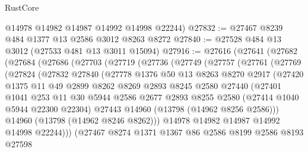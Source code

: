 \begin{lexlean}{RustCore}
\begin{coremodule}
      @14978
      @14982
      @14987
      @14992
      @14998
      @22244)
@27832 := @27467 @8239 @484 @1377 @13 @2586 @3012 @8263 @8272
@27840 := @27528 @484 @13 @3012 (@27533 @481 @13 @3011 @15094)
@27916 := @27616
    (@27641
      (@27682
        (@27684
          (@27686
            (@27703
              (@27719
                (@27736
                  (@27749
                    (@27757
                      (@27761
                        (@27769
                          (@27824
                            (@27832
                              @27840
                              (@27778
                                @1376
                                @50
                                @13
                                @8263
                                @8270
                                @2917
                                (@27420
                                  @1375
                                  @11
                                  @49
                                  @2899
                                  @8262
                                  @8269
                                  @2893
                                  @8245
                                  @2580
                                  @27440
                                  (@27401
                                    @1041
                                    @253
                                    @11
                                    @30
                                    @5944
                                    @2586
                                    @2677
                                    @2893
                                    @8255
                                    @2580
                                    (@27414 @1040 @5944 @22300 @22304)
                                    @27443
                                    @14960
                                    (@13798 (@14962 @8256 @2586)))
                                  @14960
                                  (@13798 (@14962 @8246 @8262)))
                                @14978
                                @14982
                                @14987
                                @14992
                                @14998
                                @22244)))
                          (@27467
                            @8274
                            @1371
                            @1367
                            @86
                            @2586
                            @8199
                            @2586
                            @8193
                            @27598

\end{coremodule}
\end{lexlean}
